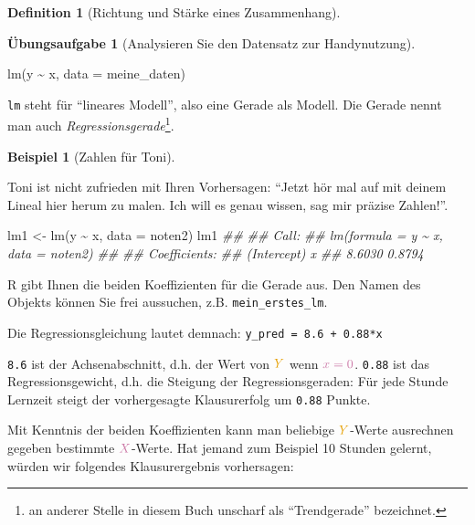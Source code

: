 \documentclass[
  a4paper,
  DIV=11]{scrreprt}
\newenvironment{Shaded}{\begin{snugshade}}{\end{snugshade}}
\newcommand{\AttributeTok}[1]{\textcolor[rgb]{0.40,0.45,0.13}{#1}}
\newcommand{\DocumentationTok}[1]{\textcolor[rgb]{0.37,0.37,0.37}{\textit{#1}}}
\newcommand{\FunctionTok}[1]{\textcolor[rgb]{0.28,0.35,0.67}{#1}}
\newcommand{\NormalTok}[1]{\textcolor[rgb]{0.00,0.23,0.31}{#1}}
\newcommand{\OtherTok}[1]{\textcolor[rgb]{0.00,0.23,0.31}{#1}}
\newcommand{\SpecialCharTok}[1]{\textcolor[rgb]{0.37,0.37,0.37}{#1}}
\theoremstyle{definition}
\newtheorem{exercise}{Übungsaufgabe}[chapter]
\theoremstyle{definition}
\newtheorem{example}{Beispiel}[chapter]
\theoremstyle{definition}
\newtheorem{definition}{Definition}[chapter]
\theoremstyle{remark}
\begin{document}
\begin{definition}[Richtung und Stärke eines
Zusammenhang]
\begin{exercise}[Analysieren Sie den Datensatz zur
Handynutzung]
\begin{Shaded}
\begin{Highlighting}[]
\FunctionTok{lm}\NormalTok{(y }\SpecialCharTok{\textasciitilde{}}\NormalTok{ x, }\AttributeTok{data =}\NormalTok{ meine\_daten)}
\end{Highlighting}
\end{Shaded}

\texttt{lm} steht für ``lineares Modell'', also eine Gerade als Modell.
Die Gerade nennt man auch \emph{Regressionsgerade}\footnote{an anderer
  Stelle in diesem Buch unscharf als ``Trendgerade'' bezeichnet.}.

\begin{example}[Zahlen für
Toni]\protect\hypertarget{exm-noten5}{}\label{exm-noten5}

Toni ist nicht zufrieden mit Ihren Vorhersagen: ``Jetzt hör mal auf mit
deinem Lineal hier herum zu malen. Ich will es genau wissen, sag mir
präzise Zahlen!''.

\end{example}

\begin{Shaded}
\begin{Highlighting}[]
\NormalTok{lm1 }\OtherTok{\textless{}{-}} \FunctionTok{lm}\NormalTok{(y }\SpecialCharTok{\textasciitilde{}}\NormalTok{ x, }\AttributeTok{data =}\NormalTok{ noten2)}
\NormalTok{lm1}
\DocumentationTok{\#\# }
\DocumentationTok{\#\# Call:}
\DocumentationTok{\#\# lm(formula = y \textasciitilde{} x, data = noten2)}
\DocumentationTok{\#\# }
\DocumentationTok{\#\# Coefficients:}
\DocumentationTok{\#\# (Intercept)            x  }
\DocumentationTok{\#\#      8.6030       0.8794}
\end{Highlighting}
\end{Shaded}

R gibt Ihnen die beiden Koeffizienten für die Gerade aus. Den Namen des
Objekts können Sie frei aussuchen, z.B. \texttt{mein\_erstes\_lm}.

Die Regressionsgleichung lautet demnach:
\texttt{y\_pred\ =\ 8.6\ +\ 0.88*x}

\texttt{8.6} ist der Achsenabschnitt, d.h. der Wert von
\(\color{ycol}{Y}\) wenn \(\color{xcol}{x}=0\). \texttt{0.88} ist das
Regressionsgewicht, d.h. die Steigung der Regressionsgeraden: Für jede
Stunde Lernzeit steigt der vorhergesagte Klausurerfolg um \texttt{0.88}
Punkte.

Mit Kenntnis der beiden Koeffizienten kann man beliebige
\(\color{ycol}{Y}\)-Werte ausrechnen gegeben bestimmte
\(\color{xcol}{X}\)-Werte. Hat jemand zum Beispiel 10 Stunden gelernt,
würden wir folgendes Klausurergebnis vorhersagen:


\end{exercise}
\end{definition}
\end{document}
